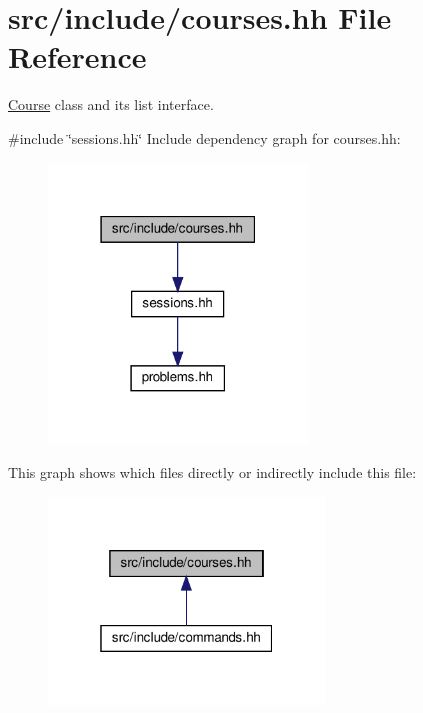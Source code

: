 \hypertarget{courses_8hh}{}\section{src/include/courses.hh File Reference}
\label{courses_8hh}


\hyperlink{classCourse}{Course} class and its list interface.  


{\ttfamily \#include \char`\"{}sessions.\+hh\char`\"{}}\newline
Include dependency graph for courses.\+hh\+:
\nopagebreak
\begin{figure}[H]
\begin{center}
\leavevmode
\includegraphics[width=195pt]{courses_8hh__incl}
\end{center}
\end{figure}
This graph shows which files directly or indirectly include this file\+:
\nopagebreak
\begin{figure}[H]
\begin{center}
\leavevmode
\includegraphics[width=208pt]{courses_8hh__dep__incl}
\end{center}
\end{figure}
